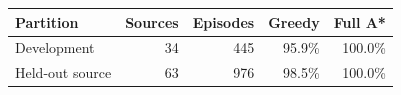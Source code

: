 \begin{tabular}{lrrrr}\toprule
Partition & Sources & Episodes & Greedy & Full A*\\\midrule
Development & 34 & 445 & 95.9\% & 100.0\%\\
Held-out source & 63 & 976 & 98.5\% & 100.0\%\\
\bottomrule\end{tabular}
